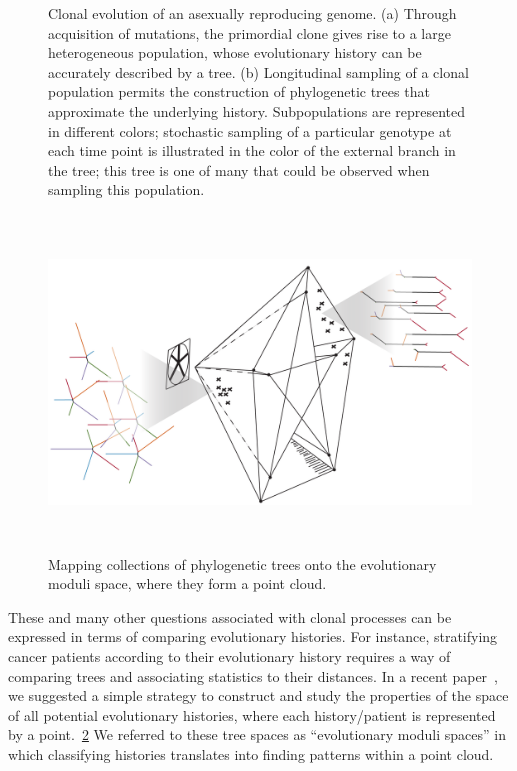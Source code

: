 \documentclass[a4paper,11pt]{article}
\begin{document}
\begin{figure}
\begin{subfigure}{0.5\linewidth}
    \end{subfigure}
    \caption{Clonal evolution of an asexually reproducing genome. (a) Through acquisition of mutations, the primordial clone gives rise to a large heterogeneous population, whose evolutionary history can be accurately described by a tree. (b) Longitudinal sampling of a clonal population permits the construction of phylogenetic trees that approximate the underlying history. Subpopulations are represented in different colors; stochastic sampling of a particular genotype at each time point is illustrated in the color of the external branch in the tree; this tree is one of many that could be observed when sampling this population.}
     \label{fig:illustration_1}
\end{figure}


\begin{figure}
    \centering
    \includegraphics[height=3.5in]{../figures/illustration_BHV_5.png}
    \caption{Mapping collections of phylogenetic trees onto the evolutionary moduli space, where they form a point cloud.}
    \label{fig:illustration_2}
\end{figure}

These and many other questions associated with clonal processes can be expressed in terms of comparing evolutionary histories.
For instance, stratifying cancer patients according to their evolutionary history requires a way of comparing trees and associating statistics to their distances.
In a recent paper~\cite{zairis2014moduli}, we suggested a simple strategy to construct and study the properties of the space of all potential evolutionary histories, where each history/patient is represented by a point.~\ref{fig:illustration_2}
We referred to these tree spaces as ``evolutionary moduli spaces'' in which classifying histories translates into finding patterns within a point cloud.
\end{document}
